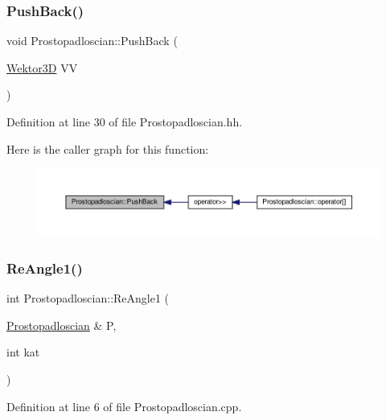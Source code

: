 \subsubsection{\texorpdfstring{Push\+Back()}{PushBack()}}
{\footnotesize\ttfamily void Prostopadloscian\+::\+Push\+Back (\begin{DoxyParamCaption}\item[{\hyperlink{_wektor3_d_8hh_ac353a272b38b4ad342f7181ad7bdb91a}{Wektor3D}}]{VV }\end{DoxyParamCaption})\hspace{0.3cm}{\ttfamily [inline]}}



Definition at line 30 of file Prostopadloscian.\+hh.

Here is the caller graph for this function\+:
\nopagebreak
\begin{figure}[H]
\begin{center}
\leavevmode
\includegraphics[width=350pt]{class_prostopadloscian_a42c4460d389ab1a0b62b6cf3e84abccd_icgraph}
\end{center}
\end{figure}
\mbox{\label{class_prostopadloscian_ac06bcf13d7548f9787d72b88512bf013}} 
\subsubsection{\texorpdfstring{Re\+Angle1()}{ReAngle1()}}
{\footnotesize\ttfamily int Prostopadloscian\+::\+Re\+Angle1 (\begin{DoxyParamCaption}\item[{\hyperlink{class_prostopadloscian}{Prostopadloscian} \&}]{P,  }\item[{int}]{kat }\end{DoxyParamCaption})}



Definition at line 6 of file Prostopadloscian.\+cpp.

\mbox{\label{class_prostopadloscian_a13ac6e1d2da93164f16552be60055049}} 
